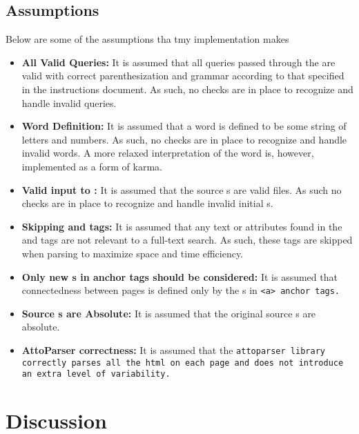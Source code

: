 \documentclass[11pt]{article}
\begin{document}
\subsection{Assumptions}
Below are some of the assumptions tha tmy implementation makes
\begin{itemize}
	\item \textbf{All Valid Queries: } It is assumed that all queries passed through the \WS{} are valid with correct parenthesization and grammar according to that specified in the instructions document. As such, no checks are in place to recognize and handle invalid queries.
	\item \textbf{Word Definition: } It is assumed that a word is defined to be some string of letters and numbers. As such, no checks are in place to recognize and handle invalid words. A more relaxed interpretation of the word is, however, implemented as a form of karma.
	\item \textbf{Valid input to \WC{}: } It is assumed that the source \URL s are valid \html{} files. As such no checks are in place to recognize and handle invalid initial \URL s.
	\item \textbf{Skipping \style{} and \script{} tags: } It is assumed that any text or attributes found in the \style{} and \script{} tags are not relevant to a full-text search. As such, these tags are skipped when parsing to maximize space and time efficiency.
	\item \textbf{Only new \URL s in anchor tags should be considered: } It is assumed that connectedness between pages is defined only by the \URL s in \tt{<a>} anchor tags. 
	\item \textbf{Source \URL s are Absolute: }  It is assumed that the original source \URL s are absolute.
	\item\textbf{AttoParser correctness: } It is assumed that the \tt{attoparser} library correctly parses all the html on each page and does not introduce an extra level of variability. 
\end{itemize}	

\section{Discussion}
\end{document}
